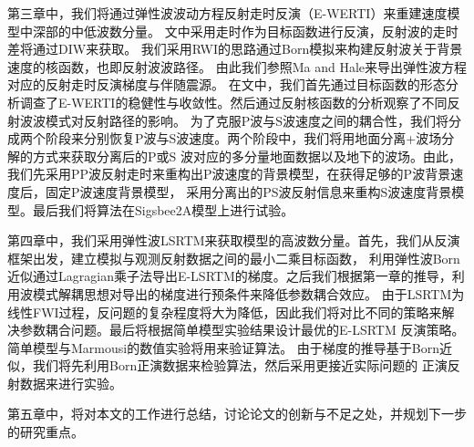 第三章中，我们将通过弹性波波动方程反射走时反演（E-WERTI）来重建速度模型中深部的中低波数分量。
文中采用走时作为目标函数进行反演，反射波的走时差将通过DIW来获取。
我们采用RWI的思路通过Born模拟来构建反射波关于背景速度的核函数，也即反射波波路径。
由此我们参照Ma and Hale\cite{ma2013}来导出弹性波方程对应的反射走时反演梯度与伴随震源。
在文中，我们首先通过目标函数的形态分析调查了E-WERTI的稳健性与收敛性。然后通过反射核函数的分析观察了不同反射波波模式对反射路径的影响。
为了克服P波与S波速度之间的耦合性，我们将分成两个阶段来分别恢复P波与S波速度。两个阶段中，我们将用地面分离+波场分解的方式来获取分离后的P或S
波对应的多分量地面数据以及地下的波场。由此，我们先采用PP波反射走时来重构出P波速度的背景模型，在获得足够的P波背景速度后，固定P波速度背景模型，
采用分离出的PS波反射信息来重构S波速度背景模型。最后我们将算法在Sigsbee2A模型上进行试验。

第四章中，我们采用弹性波LSRTM来获取模型的高波数分量。首先，我们从反演框架出发，建立模拟与观测反射数据之间的最小二乘目标函数，
利用弹性波Born近似通过Lagragian乘子法导出E-LSRTM的梯度。之后我们根据第一章的推导，利用波模式解耦思想对导出的梯度进行预条件来降低参数耦合效应。
由于LSRTM为线性FWI过程，反问题的复杂程度将大为降低，因此我们将对比不同的策略来解决参数耦合问题。最后将根据简单模型实验结果设计最优的E-LSRTM
反演策略。简单模型与Marmousi的数值实验将用来验证算法。
由于梯度的推导基于Born近似，我们将先利用Born正演数据来检验算法，然后采用更接近实际问题的
正演反射数据来进行实验。

第五章中，将对本文的工作进行总结，讨论论文的创新与不足之处，并规划下一步的研究重点。
